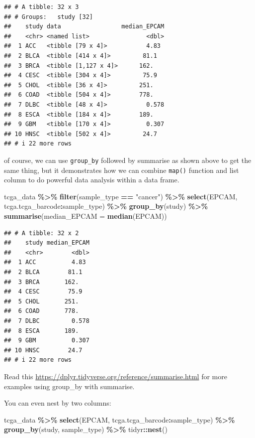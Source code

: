 \documentclass[
]{book}
\newenvironment{Shaded}{\begin{snugshade}}{\end{snugshade}}
\newcommand{\AttributeTok}[1]{\textcolor[rgb]{0.13,0.29,0.53}{#1}}
\newcommand{\FunctionTok}[1]{\textcolor[rgb]{0.13,0.29,0.53}{\textbf{#1}}}
\newcommand{\NormalTok}[1]{#1}
\newcommand{\SpecialCharTok}[1]{\textcolor[rgb]{0.81,0.36,0.00}{\textbf{#1}}}
\newcommand{\StringTok}[1]{\textcolor[rgb]{0.31,0.60,0.02}{#1}}
\begin{document}
\begin{verbatim}
## # A tibble: 32 x 3
## # Groups:   study [32]
##    study data                 median_EPCAM
##    <chr> <named list>                <dbl>
##  1 ACC   <tibble [79 x 4]>           4.83 
##  2 BLCA  <tibble [414 x 4]>         81.1  
##  3 BRCA  <tibble [1,127 x 4]>      162.   
##  4 CESC  <tibble [304 x 4]>         75.9  
##  5 CHOL  <tibble [36 x 4]>         251.   
##  6 COAD  <tibble [504 x 4]>        778.   
##  7 DLBC  <tibble [48 x 4]>           0.578
##  8 ESCA  <tibble [184 x 4]>        189.   
##  9 GBM   <tibble [170 x 4]>          0.307
## 10 HNSC  <tibble [502 x 4]>         24.7  
## # i 22 more rows
\end{verbatim}

of course, we can use \texttt{group\_by} followed by summarise as shown above to get the same thing, but it demonstrates how we can combine \texttt{map()} function and list column to do powerful data analysis within a data frame.

\begin{Shaded}
\begin{Highlighting}[]
\NormalTok{tcga\_data }\SpecialCharTok{\%\textgreater{}\%}
  \FunctionTok{filter}\NormalTok{(sample\_type }\SpecialCharTok{==} \StringTok{"cancer"}\NormalTok{) }\SpecialCharTok{\%\textgreater{}\%}
  \FunctionTok{select}\NormalTok{(EPCAM, tcga.tcga\_barcode}\SpecialCharTok{:}\NormalTok{sample\_type) }\SpecialCharTok{\%\textgreater{}\%}
  \FunctionTok{group\_by}\NormalTok{(study) }\SpecialCharTok{\%\textgreater{}\%}
  \FunctionTok{summarise}\NormalTok{(}\AttributeTok{median\_EPCAM =} \FunctionTok{median}\NormalTok{(EPCAM))}
\end{Highlighting}
\end{Shaded}

\begin{verbatim}
## # A tibble: 32 x 2
##    study median_EPCAM
##    <chr>        <dbl>
##  1 ACC          4.83 
##  2 BLCA        81.1  
##  3 BRCA       162.   
##  4 CESC        75.9  
##  5 CHOL       251.   
##  6 COAD       778.   
##  7 DLBC         0.578
##  8 ESCA       189.   
##  9 GBM          0.307
## 10 HNSC        24.7  
## # i 22 more rows
\end{verbatim}

Read this \url{https://dplyr.tidyverse.org/reference/summarise.html} for more examples using group\_by with summarise.

You can even nest by two columns:

\begin{Shaded}
\begin{Highlighting}[]
\NormalTok{tcga\_data }\SpecialCharTok{\%\textgreater{}\%}
  \FunctionTok{select}\NormalTok{(EPCAM, tcga.tcga\_barcode}\SpecialCharTok{:}\NormalTok{sample\_type) }\SpecialCharTok{\%\textgreater{}\%}
  \FunctionTok{group\_by}\NormalTok{(study, sample\_type) }\SpecialCharTok{\%\textgreater{}\%}
\NormalTok{  tidyr}\SpecialCharTok{::}\FunctionTok{nest}\NormalTok{()}
\end{Highlighting}
\end{Shaded}
\end{document}
